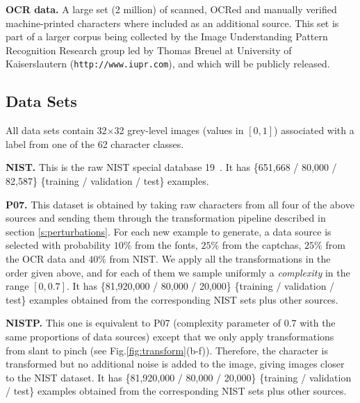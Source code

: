 \documentclass{article} %
\begin{document}
{\bf OCR data.}
A large set (2 million) of scanned, OCRed and manually verified machine-printed 
characters where included as an
additional source. This set is part of a larger corpus being collected by the Image Understanding
Pattern Recognition Research group led by Thomas Breuel at University of Kaiserslautern 
({\tt http://www.iupr.com}), and which will be publicly released.

\subsection{Data Sets}

All data sets contain 32$\times$32 grey-level images (values in $[0,1]$) associated with a label
from one of the 62 character classes.

{\bf NIST.} This is the raw NIST special database 19~\citep{Grother-1995}. It has
\{651,668 / 80,000 / 82,587\} \{training / validation / test\} examples.

{\bf P07.} This dataset is obtained by taking raw characters from all four of the above sources
and sending them through the transformation pipeline described in section \ref{s:perturbations}.
For each new example to generate, a data source is selected with probability $10\%$ from the fonts,
$25\%$ from the captchas, $25\%$ from the OCR data and $40\%$ from NIST. We apply all the transformations in the
order given above, and for each of them we sample uniformly a \emph{complexity} in the range $[0,0.7]$.
It has \{81,920,000 / 80,000 / 20,000\} \{training / validation / test\} examples
obtained from the corresponding NIST sets plus other sources.

{\bf NISTP.} This one is equivalent to P07 (complexity parameter of $0.7$ with the same proportions of data sources)
  except that we only apply
  transformations from slant to pinch (see Fig.\ref{fig:transform}(b-f)).
  Therefore, the character is
  transformed but no additional noise is added to the image, giving images
  closer to the NIST dataset. 
It has \{81,920,000 / 80,000 / 20,000\} \{training / validation / test\} examples
obtained from the corresponding NIST sets plus other sources.
\end{document}
